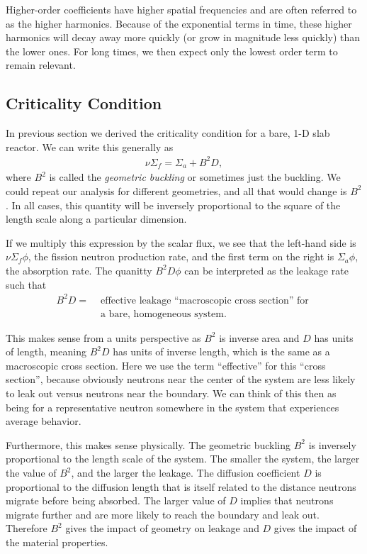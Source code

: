 Higher-order coefficients have higher spatial frequencies and are often referred to as the higher harmonics. Because of the exponential terms in time, these higher harmonics will decay away more quickly (or grow in magnitude less quickly) than the lower ones. For long times, we then expect only the lowest order term to remain relevant.

\subsection{Criticality Condition}

In previous section we derived the criticality condition for a bare, 1-D slab reactor. We can write this generally as
\begin{align}
  \nu \Sigma_f = \Sigma_a + B^2 D ,
\end{align}
where $B^2$ is called the \emph{geometric buckling} or sometimes just the buckling. We could repeat our analysis for different geometries, and all that would change is $B^2$. In all cases, this quantity will be inversely proportional to the square of the length scale along a particular dimension. 

If we multiply this expression by the scalar flux, we see that the left-hand side is $\nu \Sigma_f \phi$, the fission neutron production rate, and the first term on the right is $\Sigma_a \phi$, the absorption rate. The quanitty $B^2 D \phi$ can be interpreted as the leakage rate such that
\begin{align}
  B^2 D = 	&\text{ effective leakage ``macroscopic cross section'' for } \nonumber \\
  			&\text{ a bare, homogeneous system.} \nonumber
\end{align}

This makes sense from a units perspective as $B^2$ is inverse area and $D$ has units of length, meaning $B^2 D$ has units of inverse length, which is the same as a macroscopic cross section. Here we use the term ``effective'' for this ``cross section'', because obviously neutrons near the center of the system are less likely to leak out versus neutrons near the boundary. We can think of this then as being for a representative neutron somewhere in the system that experiences average behavior.

Furthermore, this makes sense physically. The geometric buckling $B^2$ is inversely proportional to the length scale of the system. The smaller the system, the larger the value of $B^2$, and the larger the leakage. The diffusion coefficient $D$ is proportional to the diffusion length that is itself related to the distance neutrons migrate before being absorbed. The larger value of $D$ implies that neutrons migrate further and are more likely to reach the boundary and leak out. Therefore $B^2$ gives the impact of geometry on leakage and $D$ gives the impact of the material properties.

